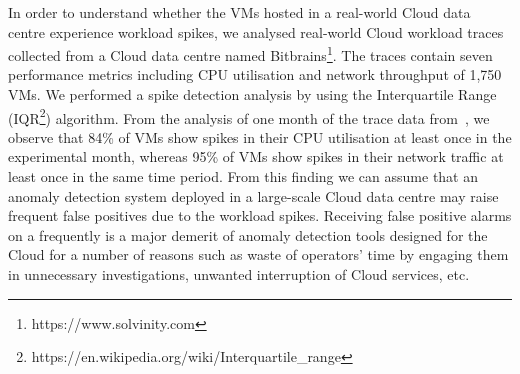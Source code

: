 In order to understand whether the VMs hosted in a real-world Cloud data centre experience workload spikes, we analysed real-world Cloud workload traces~\cite{workloadCCGRID:2015} collected from a Cloud data centre named Bitbrains\footnote{https://www.solvinity.com}. The traces contain seven performance metrics including CPU utilisation and network throughput of 1,750 VMs.
We performed a spike detection analysis by using the Interquartile Range (IQR\footnote{https://en.wikipedia.org/wiki/Interquartile\_range}) algorithm.
From the analysis of one month of the trace data from~\cite{workloadCCGRID:2015}, we observe that 84\% of VMs show spikes in their CPU utilisation at least once in the experimental month, whereas 95\% of VMs show spikes in their network traffic at least once in the same time period. 
From this finding we can assume that an anomaly detection system deployed in a large-scale Cloud data centre may raise frequent false positives due to the workload spikes. Receiving false positive alarms on a frequently is a major demerit of anomaly detection tools designed for the Cloud for a number of reasons such as waste of operators' time by engaging them in unnecessary investigations, unwanted interruption of Cloud services, etc. 
